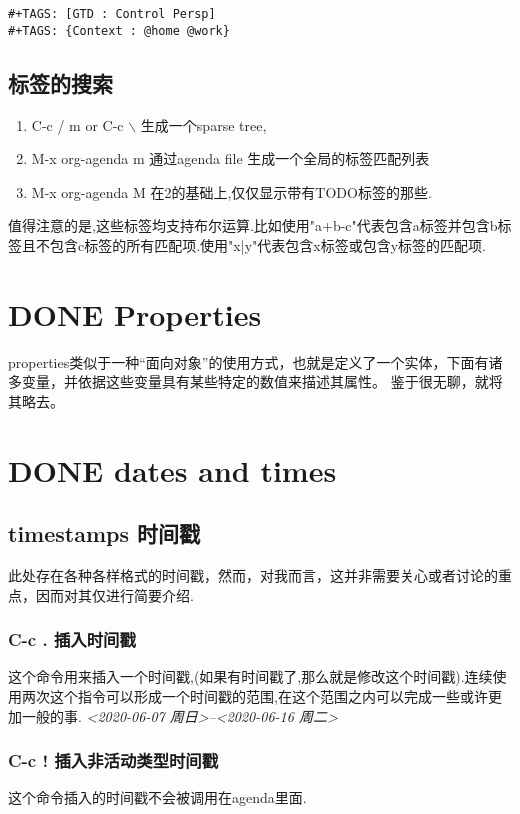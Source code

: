 \documentclass[10pt,a4paper]{article}
\begin{document}
\begin{verbatim}
#+TAGS: [GTD : Control Persp]
#+TAGS: {Context : @home @work}
\end{verbatim}

\subsection{标签的搜索}
\label{sec:org6951b70}
\begin{enumerate}
\item C-c / m or C-c $\backslash$  生成一个sparse tree,
\item M-x org-agenda m  通过agenda file 生成一个全局的标签匹配列表
\item M-x org-agenda M  在2的基础上,仅仅显示带有TODO标签的那些.
\end{enumerate}

值得注意的是,这些标签均支持布尔运算.比如使用"a+b-c"代表包含a标签并包含b标签且不包含c标签的所有匹配项.使用"x|y"代表包含x标签或包含y标签的匹配项.


\section{{\bfseries\sffamily DONE} Properties}
\label{sec:org288e0ac}
properties类似于一种“面向对象”的使用方式，也就是定义了一个实体，下面有诸多变量，并依据这些变量具有某些特定的数值来描述其属性。
鉴于很无聊，就将其略去。
\section{{\bfseries\sffamily DONE} dates and times}
\label{sec:org8b32537}
\subsection{timestamps 时间戳}
\label{sec:org585b12c}
此处存在各种各样格式的时间戳，然而，对我而言，这并非需要关心或者讨论的重点，因而对其仅进行简要介绍.
\subsubsection{C-c . 插入时间戳}
\label{sec:orgf865436}
这个命令用来插入一个时间戳,(如果有时间戳了,那么就是修改这个时间戳).连续使用两次这个指令可以形成一个时间戳的范围,在这个范围之内可以完成一些或许更加一般的事.
\textit{<2020-06-07 周日>--<2020-06-16 周二>}
\subsubsection{C-c ! 插入非活动类型时间戳}
\label{sec:orga22bc51}
这个命令插入的时间戳不会被调用在agenda里面.
\end{document}
